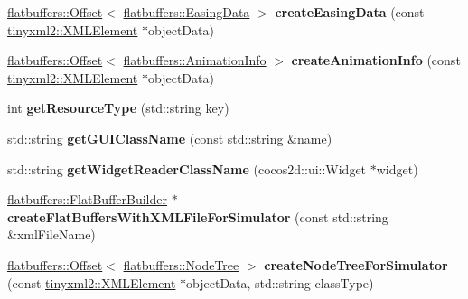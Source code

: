 \begin{DoxyCompactItemize}
\item 
\mbox{\label{classcocostudio_1_1FlatBuffersSerialize_af5c1dd6e7223f5fc77120f0917ab0f4e}} 
\hyperlink{structflatbuffers_1_1Offset}{flatbuffers\+::\+Offset}$<$ \hyperlink{structflatbuffers_1_1EasingData}{flatbuffers\+::\+Easing\+Data} $>$ {\bfseries create\+Easing\+Data} (const \hyperlink{classtinyxml2_1_1XMLElement}{tinyxml2\+::\+X\+M\+L\+Element} $\ast$object\+Data)
\item 
\mbox{\label{classcocostudio_1_1FlatBuffersSerialize_ae6a99aa10f8994f37e2627adf45e5db3}} 
\hyperlink{structflatbuffers_1_1Offset}{flatbuffers\+::\+Offset}$<$ \hyperlink{structflatbuffers_1_1AnimationInfo}{flatbuffers\+::\+Animation\+Info} $>$ {\bfseries create\+Animation\+Info} (const \hyperlink{classtinyxml2_1_1XMLElement}{tinyxml2\+::\+X\+M\+L\+Element} $\ast$object\+Data)
\item 
\mbox{\label{classcocostudio_1_1FlatBuffersSerialize_ab7fc3e7a3324471aabff437742d1a803}} 
int {\bfseries get\+Resource\+Type} (std\+::string key)
\item 
\mbox{\label{classcocostudio_1_1FlatBuffersSerialize_ada37737d77830d3ccc1580c5785a5e3c}} 
std\+::string {\bfseries get\+G\+U\+I\+Class\+Name} (const std\+::string \&name)
\item 
\mbox{\label{classcocostudio_1_1FlatBuffersSerialize_a6c758cc8ccab21b923efdc18ae1e4f10}} 
std\+::string {\bfseries get\+Widget\+Reader\+Class\+Name} (cocos2d\+::ui\+::\+Widget $\ast$widget)
\item 
\mbox{\label{classcocostudio_1_1FlatBuffersSerialize_a98d59c2cf36f55b93fb0a2aa8e351f42}} 
\hyperlink{classflatbuffers_1_1FlatBufferBuilder}{flatbuffers\+::\+Flat\+Buffer\+Builder} $\ast$ {\bfseries create\+Flat\+Buffers\+With\+X\+M\+L\+File\+For\+Simulator} (const std\+::string \&xml\+File\+Name)
\item 
\mbox{\label{classcocostudio_1_1FlatBuffersSerialize_a7e4d6d9e0c93c659e89bb3275cc5094d}} 
\hyperlink{structflatbuffers_1_1Offset}{flatbuffers\+::\+Offset}$<$ \hyperlink{structflatbuffers_1_1NodeTree}{flatbuffers\+::\+Node\+Tree} $>$ {\bfseries create\+Node\+Tree\+For\+Simulator} (const \hyperlink{classtinyxml2_1_1XMLElement}{tinyxml2\+::\+X\+M\+L\+Element} $\ast$object\+Data, std\+::string class\+Type)

\end{DoxyCompactItemize}
